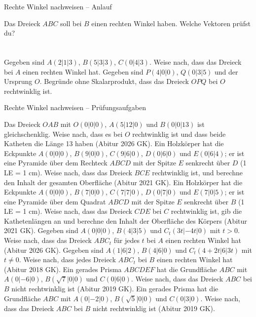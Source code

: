 \setcounter{aufgabe}{80}

\begin{aufgabe}{Rechte Winkel nachweisen – Anlauf}
\begin{teile}
\teil Das Dreieck $ABC$ soll bei $B$ einen rechten Winkel haben. Welche Vektoren prüfst du? \\  \\  \\ 
\teil Gegeben sind $A(2 | 1 | 3)$, $B(5 | 3 | 3)$, $C(0 | 4 | 3)$. Weise nach, dass das Dreieck bei $A$ einen rechten Winkel hat.
\teil Gegeben sind $P(4 | 0 | 0)$, $Q(0 | 3 | 5)$ und der Ursprung $O$. Begründe ohne Skalarprodukt, dass das Dreieck $OPQ$ bei $O$ rechtwinklig ist.
\end{teile}
\end{aufgabe}

\begin{aufgabe}{Rechte Winkel nachweisen – Prüfungsaufgaben}
\begin{teile}
\teil Das Dreieck $OAB$ mit $O(0 | 0 | 0)$, $A(5 | 12 | 0)$ und $B(0 | 0 | 13)$ ist gleichschenklig. Weise nach, dass es bei $O$ rechtwinklig ist und dass beide Katheten die Länge 13 haben \hfill (Abitur 2026 GK).
\teil Ein Holzkörper hat die Eckpunkte $A(0 | 0 | 0)$, $B(9 | 0 | 0)$, $C(9 | 6 | 0)$, $D(0 | 6 | 0)$ und $E(0 | 6 | 4)$; er ist eine Pyramide über dem Rechteck $ABCD$ mit der Spitze $E$ senkrecht über $D$ (1 LE = 1 cm). Weise nach, dass das Dreieck $BCE$ rechtwinklig ist, und berechne den Inhalt der gesamten Oberfläche \hfill (Abitur 2021 GK).
\teil Ein Holzkörper hat die Eckpunkte $A(0 | 0 | 0)$, $B(7 | 0 | 0)$, $C(7 | 7 | 0)$, $D(0 | 7 | 0)$ und $E(7 | 0 | 5)$; er ist eine Pyramide über dem Quadrat $ABCD$ mit der Spitze $E$ senkrecht über $B$ (1 LE = 1 cm). Weise nach, dass das Dreieck $CDE$ bei $C$ rechtwinklig ist, gib die Kathetenlängen an und berechne den Inhalt der Oberfläche des Körpers \hfill (Abitur 2021 GK).
\teil Gegeben sind $A(0 | 0 | 0)$, $B(4 | 3 | 5)$ und $C_t(3t | -4t | 0)$ mit $t > 0$. Weise nach, dass das Dreieck $ABC_t$ für jedes $t$ bei $A$ einen rechten Winkel hat \hfill (Abitur 2026 GK).
\teil Gegeben sind $A(1 | 6 | 2)$, $B(4 | 6 | 0)$ und $C_t(4 + 2t | 6 | 3t)$ mit $t \ne 0$. Weise nach, dass jedes Dreieck $ABC_t$ bei $B$ einen rechten Winkel hat \hfill (Abitur 2018 GK).
\teil Ein gerades Prisma $ABCDEF$ hat die Grundfläche $ABC$ mit $A(0 | -6 | 0)$, $B(\sqrt{7} | 0 | 0)$ und $C(0 | 6 | 0)$. Weise nach, dass das Dreieck $ABC$ bei $B$ nicht rechtwinklig ist \hfill (Abitur 2019 GK).
\teil Ein gerades Prisma hat die Grundfläche $ABC$ mit $A(0 | -2 | 0)$, $B(\sqrt{5} | 0 | 0)$ und $C(0 | 3 | 0)$. Weise nach, dass das Dreieck $ABC$ bei $B$ nicht rechtwinklig ist \hfill (Abitur 2019 GK).
\end{teile}
\end{aufgabe}

